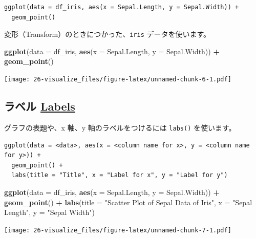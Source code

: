 \documentclass[
  xelatex, ja=standard]{bxjsbook}
\newenvironment{Shaded}{\begin{snugshade}}{\end{snugshade}}
\newcommand{\AttributeTok}[1]{\textcolor[rgb]{0.13,0.29,0.53}{#1}}
\newcommand{\FunctionTok}[1]{\textcolor[rgb]{0.13,0.29,0.53}{\textbf{#1}}}
\newcommand{\NormalTok}[1]{#1}
\newcommand{\SpecialCharTok}[1]{\textcolor[rgb]{0.81,0.36,0.00}{\textbf{#1}}}
\newcommand{\StringTok}[1]{\textcolor[rgb]{0.31,0.60,0.02}{#1}}
\theoremstyle{definition}
\theoremstyle{definition}
\theoremstyle{definition}
\theoremstyle{definition}
\theoremstyle{remark}
\begin{document}
\begin{verbatim}
ggplot(data = df_iris, aes(x = Sepal.Length, y = Sepal.Width)) +
  geom_point()
\end{verbatim}

変形（Transform）のときにつかった、\texttt{iris} データを使います。

\begin{Shaded}
\begin{Highlighting}[]
\FunctionTok{ggplot}\NormalTok{(}\AttributeTok{data =}\NormalTok{ df\_iris, }\FunctionTok{aes}\NormalTok{(}\AttributeTok{x =}\NormalTok{ Sepal.Length, }\AttributeTok{y =}\NormalTok{ Sepal.Width)) }\SpecialCharTok{+}
  \FunctionTok{geom\_point}\NormalTok{()}
\end{Highlighting}
\end{Shaded}

\texttt{[image: 26-visualize\_files/figure-latex/unnamed-chunk-6-1.pdf]}

\hypertarget{ux30e9ux30d9ux30eb-labels}{%
\subsection{\texorpdfstring{ラベル \href{https://ggplot2.tidyverse.org/reference/labs.html}{Labels}}{ラベル Labels}}\label{ux30e9ux30d9ux30eb-labels}}

グラフの表題や、x 軸、y 軸のラベルをつけるには \texttt{labs()} を使います。

\begin{verbatim}
ggplot(data = <data>, aes(x = <column name for x>, y = <column name for y>)) +
  geom_point() +
  labs(title = "Title", x = "Label for x", y = "Label for y")
\end{verbatim}

\begin{Shaded}
\begin{Highlighting}[]
\FunctionTok{ggplot}\NormalTok{(}\AttributeTok{data =}\NormalTok{ df\_iris, }\FunctionTok{aes}\NormalTok{(}\AttributeTok{x =}\NormalTok{ Sepal.Length, }\AttributeTok{y =}\NormalTok{ Sepal.Width)) }\SpecialCharTok{+}
  \FunctionTok{geom\_point}\NormalTok{() }\SpecialCharTok{+} 
  \FunctionTok{labs}\NormalTok{(}\AttributeTok{title =} \StringTok{"Scatter Plot of Sepal Data of Iris"}\NormalTok{, }\AttributeTok{x =} \StringTok{"Sepal Length"}\NormalTok{, }\AttributeTok{y =} \StringTok{"Sepal Width"}\NormalTok{)}
\end{Highlighting}
\end{Shaded}

\texttt{[image: 26-visualize\_files/figure-latex/unnamed-chunk-7-1.pdf]}
\end{document}
